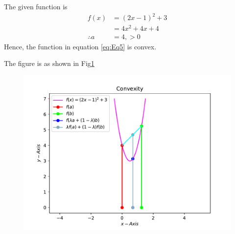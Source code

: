 \documentclass[12pt]{article}
\providecommand{\brak}[1]{\ensuremath{\left(#1\right)}}
\begin{document}
\begin{enumerate}
The given function is 
\begin{align}
        \label{eq:Eq5}
	f\brak{x} &= \brak{2x-1}^2 + 3 \\ 
	&= 4x^2+4x+4 \\
	\therefore a &= 4, > 0
\end{align}
Hence, the function in equation \eqref{eq:Eq5} is convex.

The figure is as shown in Fig\ref{fig:Fig1}
\begin{figure}[!h]
	\begin{center}
		\includegraphics[width=\columnwidth]{./figs/problem1.pdf}
	\end{center}
\caption{}
\label{fig:Fig1}
\end{figure}
\end{enumerate}
\end{document}
